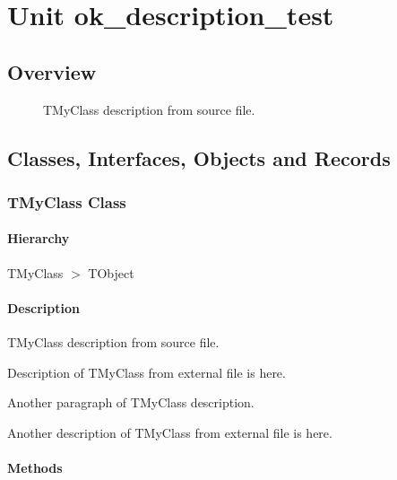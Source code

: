 \documentclass{report}
\newif\ifpdf
\begin{document}
\label{toc}\tableofcontents
\newpage
\newlength{\tmplength}
\chapter{Unit ok{\_}description{\_}test}
\label{ok_description_test}
\section{Overview}
\begin{description}
\item[\texttt{\begin{ttfamily}TMyClass\end{ttfamily} Class}]TMyClass description from source file.
\end{description}
\section{Classes, Interfaces, Objects and Records}
\ifpdf
\subsection*{\large{\textbf{TMyClass Class}}\normalsize\hspace{1ex}\hrulefill}
\else
\subsection*{TMyClass Class}
\fi
\label{ok_description_test.TMyClass}
\subsubsection*{\large{\textbf{Hierarchy}}\normalsize\hspace{1ex}\hfill}
TMyClass {$>$} TObject
\subsubsection*{\large{\textbf{Description}}\normalsize\hspace{1ex}\hfill}
TMyClass description from source file.

Description of TMyClass from external file is here.

Another paragraph of TMyClass description.

Another description of TMyClass from external file is here.\subsubsection*{\large{\textbf{Methods}}\normalsize\hspace{1ex}\hfill}
\end{document}
